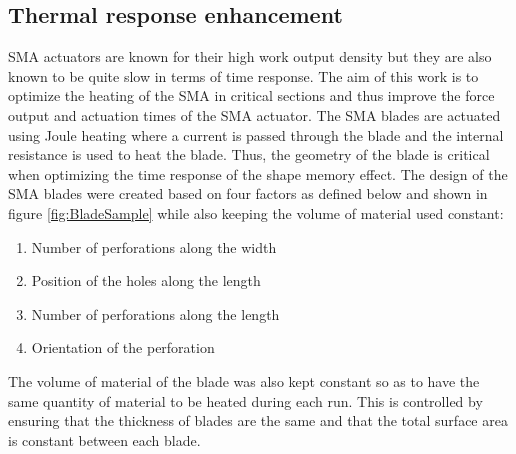 \subsection{Thermal response enhancement}
SMA actuators are known for their high work output density but they are also known to be quite slow in terms of time response. The aim of this work is to optimize the heating of the SMA in critical sections and thus improve the force output and actuation times of the SMA actuator. The SMA blades are actuated using Joule heating where a current is passed through the blade and the internal resistance is used to heat the blade. Thus, the geometry of the blade is critical when optimizing the time response of the shape memory effect. The design of the SMA blades were created based on four factors as defined below and shown in figure \ref{fig:BladeSample} while also keeping the volume of material used constant:
\begin{enumerate}[label=\textbf{Factor $x_{\arabic*}$}:,align=left]
  \item Number of perforations along the width
  \item Position of the holes along the length
  \item Number of perforations along the length
  \item Orientation of the perforation
\end{enumerate}
The volume of material of the blade was also kept constant so as to have the same quantity of material to be heated during each run. This is controlled by ensuring that the thickness of blades are the same and that the total surface area is constant between each blade.

